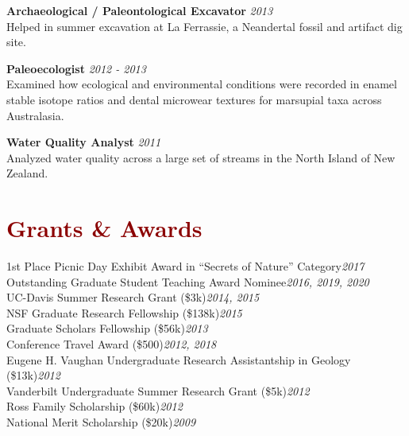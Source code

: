 \documentclass[11pt,margin,line]{resume}
\begin{document}
\begin{resume}
\textbf{Archaeological / Paleontological Excavator} \hfill \emph{2013}\\
Helped in summer excavation at La Ferrassie, a Neandertal fossil and artifact dig site.
\vspace{-1.5mm}

\textbf{Paleoecologist} \hfill \emph{2012 - 2013}\\
Examined how ecological and environmental conditions were recorded in enamel stable isotope ratios and dental microwear textures for marsupial taxa across Australasia.
\vspace{-1.5mm}

\textbf{Water Quality Analyst} \hfill \emph{2011}\\
Analyzed water quality across a large set of streams in the North Island of New Zealand.
\vspace{-1.5mm}


\vspace{-1mm}

\section{\large\textcolor{DarkRed}{Grants \& Awards}}

1st Place Picnic Day Exhibit Award in “Secrets of Nature” Category\hfill \emph{2017}\\
Outstanding Graduate Student Teaching Award Nominee\hfill \emph{2016, 2019, 2020}\\
UC-Davis Summer Research Grant (\$3k)\hfill \emph{2014, 2015}\\
NSF Graduate Research Fellowship (\$138k)\hfill \emph{2015}\\
Graduate Scholars Fellowship (\$56k)\hfill \emph{2013}\\
Conference Travel Award (\$500)\hfill \emph{2012, 2018}\\
Eugene H. Vaughan Undergraduate Research Assistantship in Geology (\$13k)\hfill \emph{2012}\\
Vanderbilt Undergraduate Summer Research Grant (\$5k)\hfill \emph{2012}\\
Ross Family Scholarship (\$60k)\hfill \emph{2012}\\
National Merit Scholarship (\$20k)\hfill \emph{2009}\\\\\\\\

\begin{comment}


\end{comment}
\end{resume}
\end{document}
